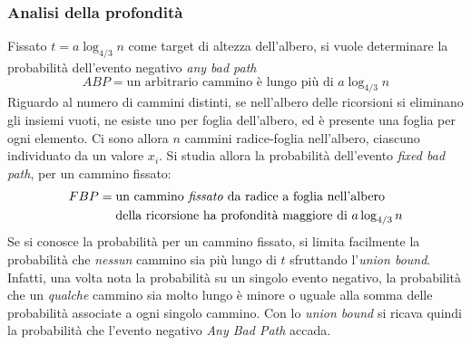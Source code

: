 \subsubsection{Analisi della profondità}

Fissato $
t = a \log_{4/3} n
$ come target di altezza dell'albero,
si vuole determinare la probabilità dell'evento negativo
\emph{any bad path}
\begin{equation*}
    ABP = 
    \text{un arbitrario cammino è lungo più di $a \log_{4/3} n$}
\end{equation*}
Riguardo al numero di cammini distinti,
se nell'albero delle ricorsioni si eliminano gli insiemi vuoti,
ne esiste uno per foglia dell'albero, ed è presente una foglia per ogni elemento.
Ci sono allora $n$ cammini radice-foglia nell'albero, ciascuno individuato da un valore $x_i$.
Si studia allora la probabilità dell'evento \emph{fixed bad path}, per un cammino fissato:
\begin{align*}
    FBP = 
    &
    \;
    \text{un cammino \emph{fissato} da radice a foglia nell'albero}
    \\
    &
    \;
    \text{della ricorsione ha profondità maggiore di $a \log_{4/3} n$}
\end{align*}
Se si conosce la probabilità per un cammino fissato,
si limita facilmente la probabilità che \emph{nessun} cammino sia più lungo di $t$ sfruttando l'\emph{union bound}.
Infatti, una volta nota la probabilità su un singolo evento negativo, la probabilità che un \emph{qualche} cammino sia molto lungo è minore o uguale alla somma delle probabilità associate a ogni singolo cammino.
Con lo \emph{union bound} si ricava quindi la probabilità che l'evento negativo \emph{Any Bad Path} accada.

